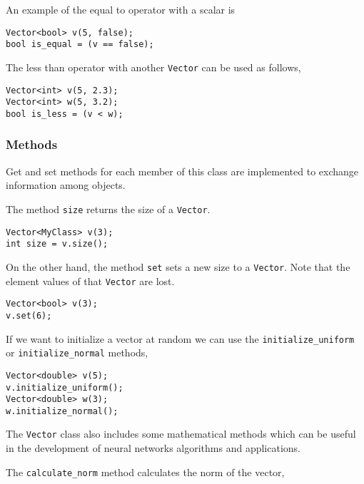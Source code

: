 An example of the equal to operator with a scalar is 

\begin{lstlisting}
Vector<bool> v(5, false);
bool is_equal = (v == false);
\end{lstlisting}

The less than operator with another \lstinline"Vector" can be used as follows,

\begin{lstlisting}
Vector<int> v(5, 2.3);
Vector<int> w(5, 3.2);
bool is_less = (v < w);
\end{lstlisting}

\subsubsection*{Methods}

Get and set methods for each member of this class are implemented to exchange information among objects. 


The method \lstinline"size" returns the size of a \lstinline"Vector".

\begin{lstlisting}
Vector<MyClass> v(3);
int size = v.size();
\end{lstlisting}

On the other hand, the method \lstinline"set" sets a new size to a \lstinline"Vector". 
Note that the element values of that \lstinline"Vector" are lost. 

\begin{lstlisting}
Vector<bool> v(3);
v.set(6);
\end{lstlisting}


If we want to initialize a vector at random we can use the \lstinline"initialize_uniform" or \lstinline"initialize_normal" methods, 

\begin{lstlisting}
Vector<double> v(5);
v.initialize_uniform();
Vector<double> w(3);
w.initialize_normal();
\end{lstlisting}


The \lstinline"Vector" class also includes some mathematical methods which can be useful in the development of neural networks algorithms and applications. 

The \lstinline"calculate_norm" method calculates the norm of the vector, 

